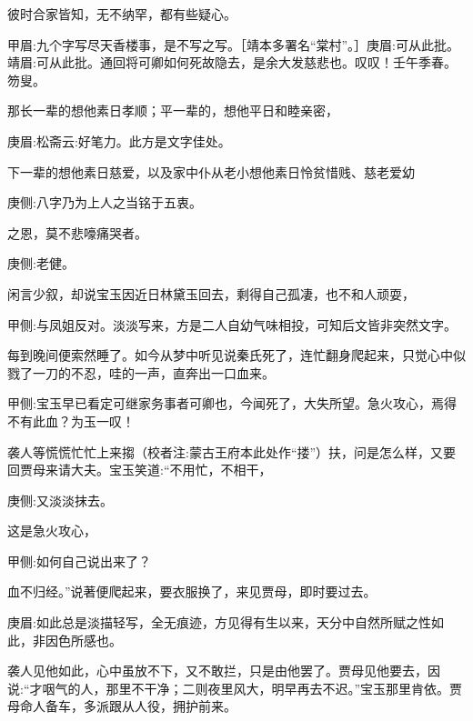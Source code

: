 \begin{parag}
    彼时合家皆知，无不纳罕，都有些疑心。\begin{note}甲眉:九个字写尽天香楼事，是不写之写。［靖本多署名“棠村”。］庚眉:可从此批。靖眉:可从此批。通回将可卿如何死故隐去，是余大发慈悲也。叹叹！壬午季春。 笏叟。\end{note}那长一辈的想他素日孝顺；平一辈的，想他平日和睦亲密，\begin{note}庚眉:松斋云:好笔力。此方是文字佳处。\end{note}下一辈的想他素日慈爱，以及家中仆从老小想他素日怜贫惜贱、慈老爱幼\begin{note}庚侧:八字乃为上人之当铭于五衷。\end{note}之恩，莫不悲嚎痛哭者。\begin{note}庚侧:老健。\end{note}
\end{parag}


\begin{parag}
    闲言少叙，却说宝玉因近日林黛玉回去，剩得自己孤凄，也不和人顽耍，\begin{note}甲侧:与凤姐反对。淡淡写来，方是二人自幼气味相投，可知后文皆非突然文字。\end{note}每到晚间便索然睡了。如今从梦中听见说秦氏死了，连忙翻身爬起来，只觉心中似戮了一刀的不忍，哇的一声，直奔出一口血来。\begin{note}甲侧:宝玉早已看定可继家务事者可卿也，今闻死了，大失所望。急火攻心，焉得不有此血？为玉一叹！\end{note}袭人等慌慌忙忙上来搊（校者注:蒙古王府本此处作“搂”）扶，问是怎么样，又要回贾母来请大夫。宝玉笑道:“不用忙，不相干，\begin{note}庚侧:又淡淡抹去。\end{note}这是急火攻心，\begin{note}甲侧:如何自己说出来了？\end{note}血不归经。”说著便爬起来，要衣服换了，来见贾母，即时要过去。\begin{note}庚眉:如此总是淡描轻写，全无痕迹，方见得有生以来，天分中自然所赋之性如此，非因色所感也。\end{note}袭人见他如此，心中虽放不下，又不敢拦，只是由他罢了。贾母见他要去，因说:“才咽气的人，那里不干净；二则夜里风大，明早再去不迟。”宝玉那里肯依。贾母命人备车，多派跟从人役，拥护前来。
\end{parag}


